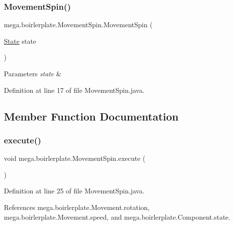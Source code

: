 \subsubsection{\texorpdfstring{Movement\+Spin()}{MovementSpin()}}
{\footnotesize\ttfamily mega.\+boirlerplate.\+Movement\+Spin.\+Movement\+Spin (\begin{DoxyParamCaption}\item[{\hyperlink{classmega_1_1boirlerplate_1_1_state}{State}}]{state }\end{DoxyParamCaption})}


\begin{DoxyParams}{Parameters}
{\em state} & \\
\hline
\end{DoxyParams}


Definition at line 17 of file Movement\+Spin.\+java.



\subsection{Member Function Documentation}
\mbox{\label{classmega_1_1boirlerplate_1_1_movement_spin_a32d7b0998080d0e2a7ab823b65808f2a}} 
\subsubsection{\texorpdfstring{execute()}{execute()}}
{\footnotesize\ttfamily void mega.\+boirlerplate.\+Movement\+Spin.\+execute (\begin{DoxyParamCaption}{ }\end{DoxyParamCaption})}



Definition at line 25 of file Movement\+Spin.\+java.



References mega.\+boirlerplate.\+Movement.\+rotation, mega.\+boirlerplate.\+Movement.\+speed, and mega.\+boirlerplate.\+Component.\+state.

\mbox{\label{classmega_1_1boirlerplate_1_1_movement_spin_a489cb6a651e4c701588e1d63b4b2fe26}} 
